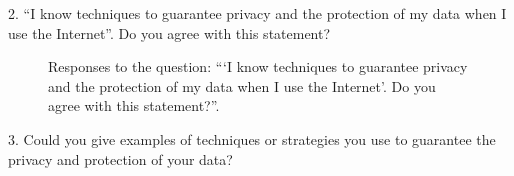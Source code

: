 \vspace{1cm}

2. ``I know techniques to guarantee privacy and the protection of my data when I use the Internet''. Do you agree with this statement?

\begin{figure}[H]
    \begin{center}
        \caption*{Responses to the question: ```I know techniques to guarantee privacy and the protection of my data when I use the Internet'. Do you agree with this statement?''.}
        \label{fig:survey_s1_q2}
    \end{center}
\end{figure}

\clearpage

3. Could you give examples of techniques or strategies you use to guarantee the privacy and protection of your data?

